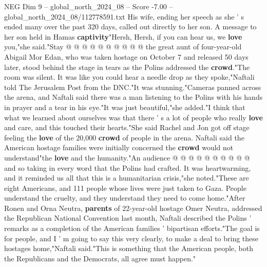 \begin{textsample}{NEG Dim 9 – global\_north\_2024\_08 – Score -7.00 – global\_north\_2024\_08/112778591.txt}
His wife, ending her speech as she ' s ended many over the past 320 days, called out directly to her son.
A message to her son held in Hamas \textbf{captivity}"Hersh, Hersh, if you can hear us, we \textbf{love} you,"she said."Stay @ @ @ @ @ @ @ @ @ @ the great aunt of four-year-old Abigail Mor Edan, who was taken hostage on October 7 and released 50 days later, stood behind the stage in tears as the Polins addressed the \textbf{crowd}."The room was silent.
It was like you could hear a needle drop as they spoke,"Naftali told The Jerusalem Post from the DNC."It was stunning."Cameras panned across the arena, and Naftali said there was a man listening to the Polins with his hands in prayer and a tear in his eye."It was just beautiful,"she added."I think that what we learned about ourselves was that there ' s a lot of people who really \textbf{love} and care, and this touched their hearts."She said Rachel and Jon got off stage feeling the \textbf{love} of the 20,000 \textbf{crowd} of people in the arena.
Naftali said the American hostage families were initially concerned the \textbf{crowd} would not understand"the \textbf{love} and the humanity."An audience @ @ @ @ @ @ @ @ @ @ and so taking in every word that the Polins had crafted.
It was heartwarming, and it reminded us all that this is a humanitarian crisis,"she noted."These are eight Americans, and 111 people whose lives were just taken to Gaza.
People understand the cruelty, and they understand they need to come home."After Ronen and Orna Neutra, \textbf{parents} of 22-year-old hostage Omer Neutra, addressed the Republican National Convention last month, Naftali described the Polins ' remarks as a completion of the American families ' bipartisan efforts."The goal is for people, and I ' m going to say this very clearly, to make a deal to bring these hostages home,"Naftali said."This is something that the American people, both the Republicans and the Democrats, all agree must happen."

\end{textsample}
